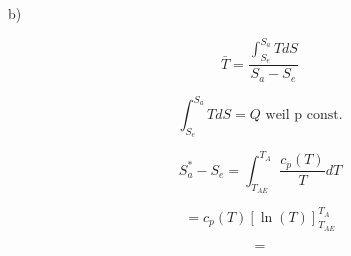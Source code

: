 b)

\[
\bar{T} = \frac{\int_{S_e}^{S_a} T dS}{S_a - S_e}
\]

\[
\int_{S_e}^{S_a} T dS = Q \text{ weil p const.}
\]

\[
S_{a}^* - S_e = \int_{T_{AE}}^{T_A} \frac{c_p (T)}{T} dT
\]

\[
= c_p (T) \left[ \ln(T) \right]_{T_{AE}}^{T_A}
\]

\[
=
\]